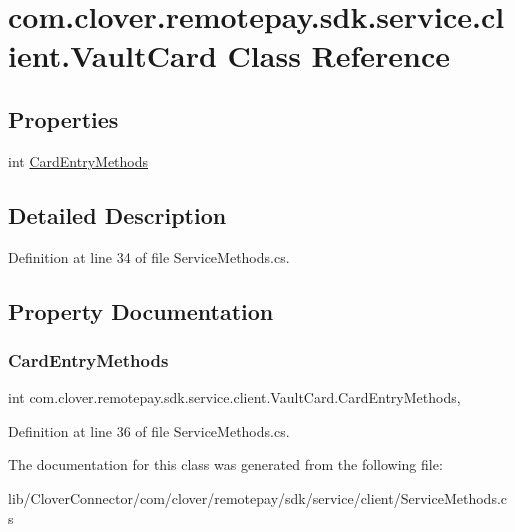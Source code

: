 \hypertarget{classcom_1_1clover_1_1remotepay_1_1sdk_1_1service_1_1client_1_1_vault_card}{}\section{com.\+clover.\+remotepay.\+sdk.\+service.\+client.\+Vault\+Card Class Reference}
\label{classcom_1_1clover_1_1remotepay_1_1sdk_1_1service_1_1client_1_1_vault_card}
\subsection*{Properties}
\begin{DoxyCompactItemize}
\item 
int \hyperlink{classcom_1_1clover_1_1remotepay_1_1sdk_1_1service_1_1client_1_1_vault_card_a53c78a2b11f1678db51831a1b4a81d72}{Card\+Entry\+Methods}
\end{DoxyCompactItemize}


\subsection{Detailed Description}


Definition at line 34 of file Service\+Methods.\+cs.



\subsection{Property Documentation}
\mbox{\label{classcom_1_1clover_1_1remotepay_1_1sdk_1_1service_1_1client_1_1_vault_card_a53c78a2b11f1678db51831a1b4a81d72}} 
\subsubsection{\texorpdfstring{Card\+Entry\+Methods}{CardEntryMethods}}
{\footnotesize\ttfamily int com.\+clover.\+remotepay.\+sdk.\+service.\+client.\+Vault\+Card.\+Card\+Entry\+Methods\hspace{0.3cm}{\ttfamily [get]}, {\ttfamily [set]}}



Definition at line 36 of file Service\+Methods.\+cs.



The documentation for this class was generated from the following file\+:\begin{DoxyCompactItemize}
\item 
lib/\+Clover\+Connector/com/clover/remotepay/sdk/service/client/Service\+Methods.\+cs\end{DoxyCompactItemize}
